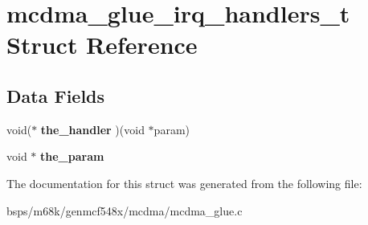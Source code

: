\hypertarget{structmcdma__glue__irq__handlers__t}{}\section{mcdma\+\_\+glue\+\_\+irq\+\_\+handlers\+\_\+t Struct Reference}
\label{structmcdma__glue__irq__handlers__t}
\subsection*{Data Fields}
\begin{DoxyCompactItemize}
\item 
\mbox{\label{structmcdma__glue__irq__handlers__t_a4bf2f06e46305e5bf3b1c78e10a5532b}} 
void($\ast$ {\bfseries the\+\_\+handler} )(void $\ast$param)
\item 
\mbox{\label{structmcdma__glue__irq__handlers__t_a9e8c8d1ede4d6198b66216778e2cff95}} 
void $\ast$ {\bfseries the\+\_\+param}
\end{DoxyCompactItemize}


The documentation for this struct was generated from the following file\+:\begin{DoxyCompactItemize}
\item 
bsps/m68k/genmcf548x/mcdma/mcdma\+\_\+glue.\+c\end{DoxyCompactItemize}
